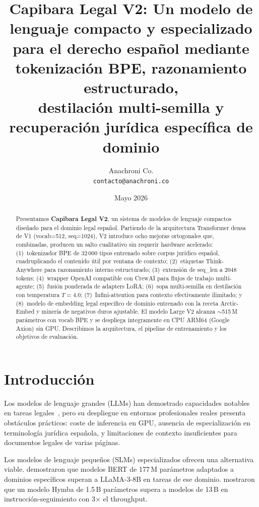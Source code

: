 \documentclass[11pt,a4paper]{article}
\title{%
  \textbf{Capibara Legal V2}: Un modelo de lenguaje compacto y especializado\\
  para el derecho español mediante tokenización BPE, razonamiento estructurado,\\
  destilación multi-semilla y recuperación jurídica específica de dominio%
}
\author{%
  Anachroni Co.\\
  \texttt{contacto@anachroni.co}
}
\date{Mayo 2026}
\begin{document}
\maketitle

\begin{abstract}
Presentamos \textbf{Capibara Legal V2}, un sistema de modelos de lenguaje compactos diseñado
para el dominio legal español. Partiendo de la arquitectura Transformer densa de V1
(vocab=512, seq=1024), V2 introduce ocho mejoras ortogonales que, combinadas, producen
un salto cualitativo sin requerir hardware acelerado: (1)~tokenizador BPE de 32\,000 tipos
entrenado sobre corpus jurídico español, cuadruplicando el contenido útil por ventana de
contexto; (2)~etiquetas Think-Anywhere para razonamiento interno estructurado; (3)~extensión
de seq\_len a 2048 tokens; (4)~wrapper OpenAI compatible con CrewAI para flujos de trabajo
multi-agente; (5)~fusión ponderada de adapters LoRA; (6)~sopa multi-semilla en destilación
con temperatura $T=4.0$; (7)~Infini-attention para contexto efectivamente ilimitado; y
(8)~modelo de embedding legal específico de dominio entrenado con la receta Arctic-Embed
y minería de negativos duros ajustable. El modelo Large V2 alcanza $\sim$515\,M parámetros
con vocab BPE y se despliega íntegramente en CPU ARM64 (Google Axion) sin GPU.
Describimos la arquitectura, el pipeline de entrenamiento y los objetivos de evaluación.
\end{abstract}

\tableofcontents
\newpage

\section{Introducción}
\label{sec:intro}

Los modelos de lenguaje grandes (LLMs) han demostrado capacidades notables en tareas
legales~\citep{nay2023large}, pero su despliegue en entornos profesionales reales
presenta obstáculos prácticos: coste de inferencia en GPU, ausencia de
especialización en terminología jurídica española, y limitaciones de contexto
insuficientes para documentos legales de varias páginas.

Los modelos de lenguaje pequeños (SLMs) especializados ofrecen una alternativa viable.
\citet{gurgurov2024adapting} demostraron que modelos BERT de 177\,M parámetros
adaptados a dominios específicos superan a LLaMA-3-8B en tareas de ese dominio.
\citet{belcak2025small} mostraron que un modelo Hymba de 1.5\,B parámetros supera
a modelos de 13\,B en instrucción-seguimiento con 3$\times$ el throughput.
\end{document}
